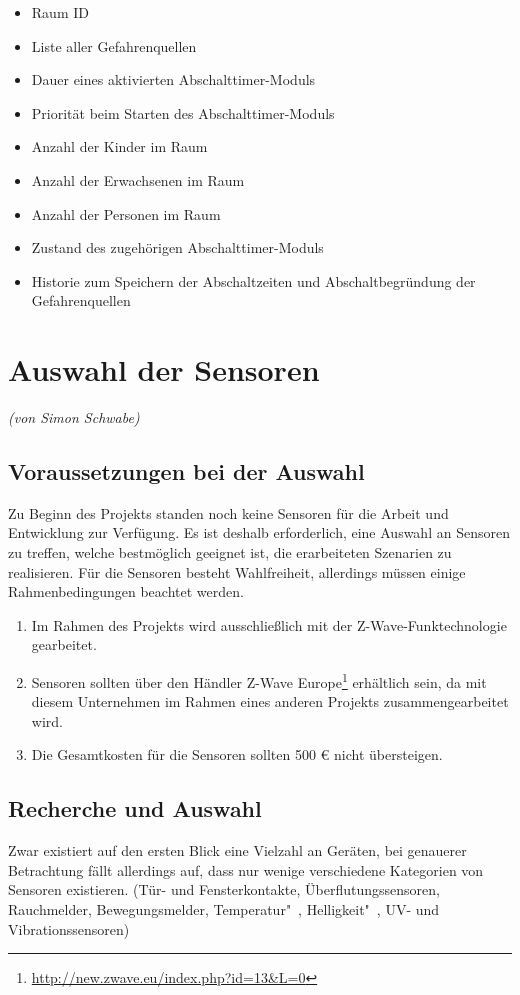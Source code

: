 \begin{itemize}
	\item Raum ID
	\item Liste aller Gefahrenquellen
	\item Dauer eines aktivierten Abschalttimer-Moduls
	\item Priorität beim Starten des Abschalttimer-Moduls
	\item Anzahl der Kinder im Raum
	\item Anzahl der Erwachsenen im Raum
	\item Anzahl der Personen im Raum
	\item Zustand des zugehörigen Abschalttimer-Moduls
	\item Historie zum Speichern der Abschaltzeiten und Abschaltbegründung der Gefahrenquellen
\end{itemize}

\section{Auswahl der Sensoren}
\emph{(von Simon Schwabe)}
\subsection{Voraussetzungen bei der Auswahl}
Zu Beginn des Projekts standen noch keine Sensoren für die Arbeit und Entwicklung zur Verfügung. Es ist deshalb erforderlich, eine Auswahl an Sensoren zu treffen, welche bestmöglich geeignet ist, die erarbeiteten Szenarien zu realisieren. Für die Sensoren besteht Wahlfreiheit, allerdings müssen einige Rahmenbedingungen beachtet werden.

\begin{enumerate}
	\item Im Rahmen des Projekts wird ausschließlich mit der Z-Wave-Funktechnologie gearbeitet.
	\item Sensoren sollten über den Händler Z-Wave Europe\footnote{\url{http://new.zwave.eu/index.php?id=13\&L=0}} erhältlich sein, da mit diesem Unternehmen im Rahmen eines anderen Projekts zusammengearbeitet wird.
	\item Die Gesamtkosten für die Sensoren sollten 500 € nicht übersteigen.
\end{enumerate}

\subsection{Recherche und Auswahl}
Zwar existiert auf den ersten Blick eine Vielzahl an Geräten, bei genauerer Betrachtung fällt allerdings auf, dass nur wenige verschiedene Kategorien von Sensoren existieren. (Tür- und Fensterkontakte, Überflutungssensoren, Rauchmelder, Bewegungsmelder, Temperatur"~, Helligkeit"~, UV- und Vibrationssensoren)

